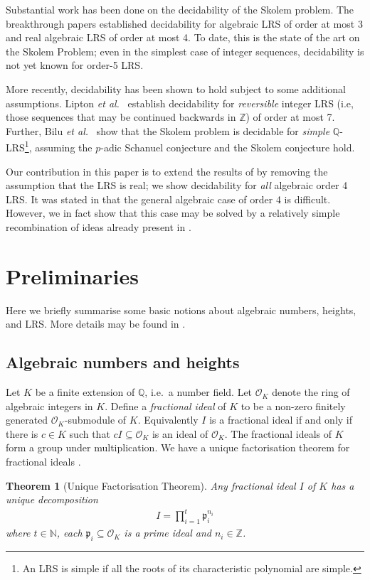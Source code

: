 \documentclass{article}\usepackage[a4paper,margin=20mm]{geometry}
\newtheorem{theorem}{Theorem}\newtheorem{lemma}[theorem]{Lemma}\newtheorem{proposition}[theorem]{Proposition}\newtheorem{corollary}[theorem]{Corollary}\newtheorem{definition}[theorem]{Definition}\newtheorem{claim}[theorem]{Claim}\newtheorem{remark}[theorem]{Remark}\newtheorem{observation}[theorem]{Observation}\newtheorem{conjecture}[theorem]{Conjecture}\newtheorem{example}[theorem]{Example}
\newcommand{\Q}{\mathbb{Q}}
\newcommand{\p}{\mathfrak{p}}
\newcommand{\Z}{\mathbb{Z}}
\newcommand{\N}{\mathbb{N}}
\renewcommand{\O}{\mathcal{O}}
\begin{document}
Substantial work has been done on the decidability of the Skolem problem. The breakthrough papers \cite{Vereshchagin,Mignotte_distance} established decidability for algebraic LRS of order at most 3 and real algebraic LRS of order at most 4. To date, this is the state of the art on the Skolem Problem; even in the simplest case of integer sequences, decidability is not yet known for order-5 LRS. 

More recently, decidability has been shown to hold subject to some additional assumptions. Lipton \emph{et al.}\ \cite{Lipton_2022} establish decidability for \emph{reversible} integer LRS (i.e, those sequences that may be continued backwards in $\Z$) of order at most 7. Further, Bilu \emph{et al.}\ \cite{Yuri_2023} show that the Skolem problem is decidable for \emph{simple} $\Q$-LRS\footnote{An LRS is simple if all the roots of its characteristic polynomial are simple.}, assuming the $p$-adic Schanuel conjecture and the Skolem conjecture hold. 
	
Our contribution in this paper is to extend the results of \cite{Vereshchagin,Mignotte_distance} by removing the assumption that the LRS is real; we show decidability for \emph{all} algebraic order 4 LRS. It was stated in \cite[p. 33]{Chonev} that the general algebraic case of order 4 is difficult. However, we in fact show that this case may be solved by a relatively simple recombination of ideas already present in \cite{Vereshchagin,Mignotte_distance}.

 \section{Preliminaries}\label{Prelim}
 Here we briefly summarise some basic notions about algebraic numbers, heights, and LRS. More details may be found in \cite{neukirch_algebraic_1999,Waldschmidt_book}.
\subsection{Algebraic numbers and heights}
 Let $K$ be a finite extension of $\Q$, i.e.\ a number field. Let $\O_K$ denote the ring of algebraic integers in $K$. Define a \emph{fractional ideal} of $K$ to be a non-zero finitely generated $\O_K$-submodule of $K$. Equivalently $I$ is a fractional ideal if and only if there is $c \in K$ such that $cI \subseteq \O_K$ is an ideal of $\O_K$. The fractional ideals of $K$ form a group under multiplication. We have a unique factorisation theorem for fractional ideals \cite[p. 22]{neukirch_algebraic_1999}.
 \begin{theorem}[Unique Factorisation Theorem] \label{thm:ideal_fac}
Any fractional ideal $I$ of $K$ has a unique decomposition
\begin{align*}
I = \prod_{i=1}^t \p_i^{n_i}
\end{align*}
where $t \in \N$, each $\p_i \subseteq \O_K$ is a prime ideal and $n_i \in \Z$. 
 \end{theorem}
\end{document}
